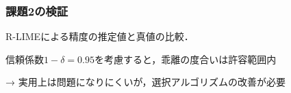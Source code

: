\documentclass[aspectratio=169]{slide-ja}
\begin{document}
\begin{frame}
  \frametitle{課題2の検証}
  \begin{table}
    \small

    
    \caption{R-LIMEによる精度の推定値と真値の比較．}
  \end{table}

  信頼係数$1-\delta=0.95$を考慮すると，乖離の度合いは許容範囲内

  → 実用上は問題になりにくいが，選択アルゴリズムの改善が必要
\end{frame}
\end{document}
